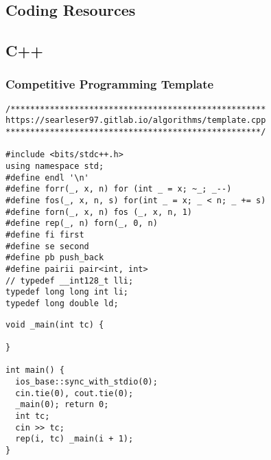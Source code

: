 \documentclass[twoside]{article}
\begin{document}

\null
\thispagestyle{empty}
\newpage
{}
\selectfont
\begin{multicols*}{2}
	\tableofcontents
	\newpage
	\cleardoublepage
{}
\sectionfont{\bfseries\sffamily\centering\Huge}
\vspace{1em}
\section*{Coding Resources}
\vspace{3em}
\subsectionfont{\bfseries\sffamily\centering\LARGE}
\vspace{0em}
\subsection*{C++}
\vspace{2em}
\subsubsectionfont{\large\bfseries\sffamily\underline}
\subsubsection*{Competitive Programming Template}
\begin{verbatim}
/****************************************************
https://searleser97.gitlab.io/algorithms/template.cpp
****************************************************/

#include <bits/stdc++.h>
using namespace std;
#define endl '\n'
#define forr(_, x, n) for (int _ = x; ~_; _--)
#define fos(_, x, n, s) for(int _ = x; _ < n; _ += s)
#define forn(_, x, n) fos (_, x, n, 1)
#define rep(_, n) forn(_, 0, n)
#define fi first
#define se second
#define pb push_back
#define pairii pair<int, int>
// typedef __int128_t lli;
typedef long long int li;
typedef long double ld;
\end{verbatim}
\vspace{-12pt}
\begin{verbatim}
void _main(int tc) {

}

int main() {
  ios_base::sync_with_stdio(0);
  cin.tie(0), cout.tie(0);
  _main(0); return 0;
  int tc;
  cin >> tc;
  rep(i, tc) _main(i + 1);
}
\end{verbatim}

\subsubsectionfont{\large\bfseries\sffamily\underline}

\end{multicols*}
\end{document}

